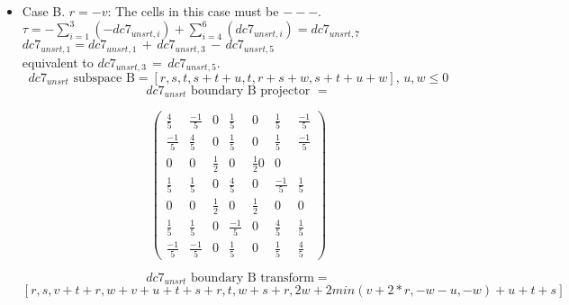 \documentclass[preprint]{iucr}              %
\begin{document}
{\begin{itemize}
     \item{Case B. $r=-v$:  The cells in this case must be $---$.\\
     $\tau=-\sum_{i=1}^3(-dc7_{unsrt,i})+\sum_{i=4}^6(dc7_{unsrt,i}) = dc7_{unsrt,7}$\\
     $dc7_{unsrt,1}=dc7_{unsrt,1}\,+\,dc7_{unsrt,3}\,-\,dc7_{unsrt,5}$\\
          equivalent to
     $dc7_{unsrt,3}\,=\,dc7_{unsrt,5}$.
     \[dc7_{unsrt} \text{ subspace B}=[r,s,t,s+t+u,t,r+s+w,s+t+u+w],\, u, w \leq 0 \]
     \[dc7_{unsrt} \text{ boundary B projector } =\]
\begin{center}
\begin{equation*}
\begin{pmatrix}
\frac{4}{5}&\frac{-1}{5}&0&\frac{1}{5}&0&\frac{1}{5}&\frac{-1}{5}\\[.25em]
\frac{-1}{5}&\frac{4}{5}&0&\frac{1}{5}&0&\frac{1}{5}&\frac{-1}{5}\\[.25em]
0&0&\frac{1}{2}&0&\frac{1}{2}0&0\\[.25em]
\frac{1}{5}&\frac{1}{5}&0&\frac{4}{5}&0&\frac{-1}{5}&\frac{1}{5}\\[.25em]
0&0&\frac{1}{2}&0&\frac{1}{2}&0&0\\[.25em]
\frac{1}{5}&\frac{1}{5}&0&\frac{-1}{5}&0&\frac{4}{5}&\frac{1}{5}\\[.25em]
\frac{-1}{5}&\frac{-1}{5}&0&\frac{1}{5}&0&\frac{1}{5}&\frac{4}{5}
\end{pmatrix}
\end{equation*}
\end{center}


    \[dc7_{unsrt} \text{ boundary B transform}=\]
    \[[r,s,v+t+r,w+v+u+t+s+r,t,w+s+r,2 w+2 min(v+2*r,-w-u,-w)+u+t+s]\]
     }


\end{itemize}}
\end{document}
